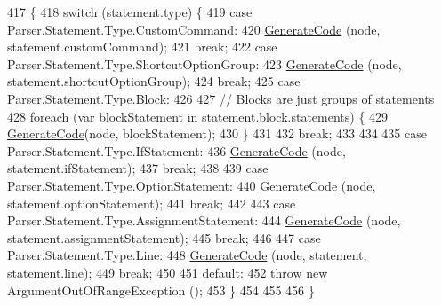 \begin{DoxyCode}
417                                                                  \{
418             \textcolor{keywordflow}{switch} (statement.type) \{
419             \textcolor{keywordflow}{case} Parser.Statement.Type.CustomCommand:
420                 \hyperlink{a00032_a006f3becd521cc179ba3d3352f6f930b}{GenerateCode} (node, statement.customCommand);
421                 \textcolor{keywordflow}{break};
422             \textcolor{keywordflow}{case} Parser.Statement.Type.ShortcutOptionGroup:
423                 \hyperlink{a00032_a006f3becd521cc179ba3d3352f6f930b}{GenerateCode} (node, statement.shortcutOptionGroup);
424                 \textcolor{keywordflow}{break};
425             \textcolor{keywordflow}{case} Parser.Statement.Type.Block:
426                 
427                 \textcolor{comment}{// Blocks are just groups of statements}
428                 \textcolor{keywordflow}{foreach} (var blockStatement \textcolor{keywordflow}{in} statement.block.statements) \{
429                     \hyperlink{a00032_a006f3becd521cc179ba3d3352f6f930b}{GenerateCode}(node, blockStatement);
430                 \}
431 
432                 \textcolor{keywordflow}{break};
433 
434 
435             \textcolor{keywordflow}{case} Parser.Statement.Type.IfStatement:
436                 \hyperlink{a00032_a006f3becd521cc179ba3d3352f6f930b}{GenerateCode} (node, statement.ifStatement);
437                 \textcolor{keywordflow}{break};
438 
439             \textcolor{keywordflow}{case} Parser.Statement.Type.OptionStatement:
440                 \hyperlink{a00032_a006f3becd521cc179ba3d3352f6f930b}{GenerateCode} (node, statement.optionStatement);
441                 \textcolor{keywordflow}{break};
442 
443             \textcolor{keywordflow}{case} Parser.Statement.Type.AssignmentStatement:
444                 \hyperlink{a00032_a006f3becd521cc179ba3d3352f6f930b}{GenerateCode} (node, statement.assignmentStatement);
445                 \textcolor{keywordflow}{break};
446 
447             \textcolor{keywordflow}{case} Parser.Statement.Type.Line:
448                 \hyperlink{a00032_a006f3becd521cc179ba3d3352f6f930b}{GenerateCode} (node, statement, statement.line);
449                 \textcolor{keywordflow}{break};
450 
451             \textcolor{keywordflow}{default}:
452                 \textcolor{keywordflow}{throw} \textcolor{keyword}{new} ArgumentOutOfRangeException ();
453             \}
454 
455 
456         \}
\end{DoxyCode}
